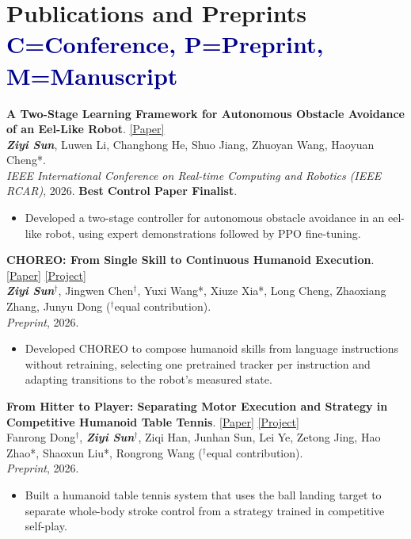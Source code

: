 \documentclass[a4paper,11pt]{article}
\newcommand{\resumeItemListStart}{\begin{itemize}[leftmargin=*,labelsep=1mm,itemsep=0.5mm,label={$\vcenter{\hbox{\tiny$\circ$}}$}]}
\newcommand{\resumeItemListEnd}{\end{itemize}\vspace{-2mm}}
\begin{document}
\section{\texorpdfstring{\textbf{Publications and Preprints} \hfill \textcolor{darkblue}{\scriptsize C=Conference, P=Preprint, M=Manuscript}}{Publications and Preprints}}
\vspace{0.2mm}
\small{
\begin{enumerate}[leftmargin=*, labelsep=0.5em, align=left, widest={[\textbf{SW.1}]}, itemindent=0em, label={}, itemsep=1.2mm]

\item[\textbf{[C.1]}] \textbf{A Two-Stage Learning Framework for Autonomous Obstacle Avoidance of an Eel-Like Robot}. \href{https://ieeexplore.ieee.org/abstract/document/11765137}{[Paper]}\\
\textit{\textbf{Ziyi Sun}}, Luwen Li, Changhong He, Shuo Jiang, Zhuoyan Wang, Haoyuan Cheng*.\\
\textit{IEEE International Conference on Real-time Computing and Robotics (IEEE RCAR)}, 2026.
\textbf{Best Control Paper Finalist}.
\resumeItemListStart
  \item Developed a two-stage controller for autonomous obstacle avoidance in an eel-like robot, using expert demonstrations followed by PPO fine-tuning.
\resumeItemListEnd

\item[\textbf{[P.1]}] \textbf{CHOREO: From Single Skill to Continuous Humanoid Execution}. \href{https://arxiv.org/pdf/2609.22274}{[Paper]} \href{https://ziyisun85-ops.github.io/Project-choreo/}{[Project]}\\
\textit{\textbf{Ziyi Sun}}$^\dagger$, Jingwen Chen$^\dagger$, Yuxi Wang*, Xiuze Xia*, Long Cheng, Zhaoxiang Zhang, Junyu Dong ($^\dagger$equal contribution).\\
\textit{Preprint}, 2026.
\resumeItemListStart
  \item Developed CHOREO to compose humanoid skills from language instructions without retraining, selecting one pretrained tracker per instruction and adapting transitions to the robot's measured state.
\resumeItemListEnd

\item[\textbf{[P.2]}] \textbf{From Hitter to Player: Separating Motor Execution and Strategy in Competitive Humanoid Table Tennis}. \href{https://arxiv.org/pdf/2610.14067}{[Paper]} \href{https://mufanmufan.github.io/hitter-to-player/}{[Project]}\\
Fanrong Dong$^\dagger$, \textit{\textbf{Ziyi Sun}}$^\dagger$, Ziqi Han, Junhan Sun, Lei Ye, Zetong Jing, Hao Zhao*, Shaoxun Liu*, Rongrong Wang ($^\dagger$equal contribution).\\
\textit{Preprint}, 2026.
\resumeItemListStart
  \item Built a humanoid table tennis system that uses the ball landing target to separate whole-body stroke control from a strategy trained in competitive self-play.
\resumeItemListEnd


\end{enumerate}}
\end{document}
